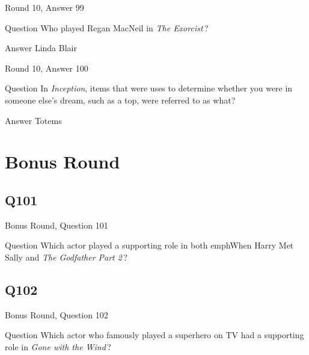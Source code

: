 \documentclass[11pt]{beamer}
\begin{document}
\begin{frame}[t]{Round 10, Answer 99}
\vspace{2em}
\begin{block}{Question}
Who played Regan MacNeil in \emph{The Exorcist}\,?
\end{block}
\pause{}
\begin{block}{Answer}
Linda Blair
\end{block}
\end{frame}
    

\begin{frame}[t]{Round 10, Answer 100}
\vspace{2em}
\begin{block}{Question}
In \emph{Inception}, items that were uses to determine whether you were in someone else's dream, such as a top, were referred to as what?
\end{block}
\pause{}
\begin{block}{Answer}
Totems
\end{block}
\end{frame}
    

\section{Bonus Round}
    

\subsection*{Q101}
\begin{frame}[t]{Bonus Round, Question 101}
\vspace{2em}
\begin{block}{Question}
Which actor played a supporting role in both emph{When Harry Met Sally} and \emph{The Godfather Part 2}\,?
\end{block}
\end{frame}
    

\subsection*{Q102}
\begin{frame}[t]{Bonus Round, Question 102}
\vspace{2em}
\begin{block}{Question}
Which actor who famously played a superhero on TV had a supporting role in \emph{Gone with the Wind}\,?
\end{block}
\end{frame}
    
\end{document}

